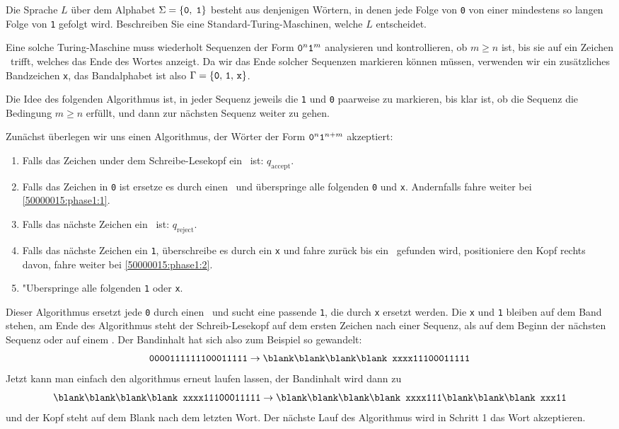 Die Sprache $L$ über dem Alphabet $\Sigma = \{{\tt 0},\;{\tt 1}\}$
besteht aus denjenigen Wörtern, in denen jede Folge von {\tt 0}
von einer mindestens so langen Folge von {\tt 1} gefolgt wird.
Beschreiben Sie eine Standard-Turing-Maschinen, welche $L$
entscheidet.


\begin{loesung}
Eine solche Turing-Maschine muss wiederholt Sequenzen der
Form ${\tt 0}^n{\tt 1}^m$ analysieren und kontrollieren, ob $m \ge n$ ist,
bis sie auf ein Zeichen \blank\ trifft, welches das Ende des
Wortes anzeigt. Da wir das Ende solcher Sequenzen markieren 
können müssen, verwenden wir ein zusätzliches Bandzeichen
{\tt x}, das Bandalphabet ist also $\Gamma
=\{{\tt 0},\,{\tt 1},\,{\tt x}\}$.

Die Idee des folgenden Algorithmus ist, in jeder Sequenz jeweils
die {\tt 1} und {\tt 0} paarweise zu markieren, bis klar ist,
ob die Sequenz die Bedingung $m\ge n$ erfüllt, und dann zur
nächsten Sequenz weiter zu gehen.

Zunächst überlegen wir uns einen Algorithmus, der Wörter der Form
${\tt 0}^n{\tt 1}^{n+m}$ akzeptiert:
\begin{enumerate}
\item Falls das Zeichen under dem Schreibe-Lesekopf ein \blank\ ist:
$q_\text{accept}$.
\item
\label{50000015:phase1:2}
Falls das Zeichen in {\tt 0} ist ersetze es durch einen \blank\ und
überspringe alle folgenden {\tt 0} und {\tt x}.
Andernfalls fahre weiter bei \ref{50000015:phase1:1}.
\item
Falls das nächste Zeichen ein \blank\ ist: $q_\text{reject}$.
\item
Falls das nächste Zeichen ein {\tt 1}, überschreibe es durch ein {\tt x}
und fahre zurück bis ein \blank\ gefunden wird, positioniere den Kopf
rechts davon, fahre weiter bei \ref{50000015:phase1:2}.
\item
\label{50000015:phase1:1}
"Uberspringe alle folgenden {\tt 1} oder {\tt x}.
\end{enumerate}
Dieser Algorithmus ersetzt jede {\tt 0} durch einen \blank\ und sucht eine
passende {\tt 1}, die durch {\tt x} ersetzt werden.
Die {\tt x} und {\tt 1} bleiben auf dem Band stehen, am Ende des Algorithmus
steht der Schreib-Lesekopf auf dem ersten Zeichen nach einer Sequenz,
als auf dem Beginn der nächsten Sequenz oder auf einem \blank.
Der Bandinhalt hat sich also zum Beispiel so gewandelt:
\[
\text {\tt 0000111111100011111}
\rightarrow
\text {\tt \blank\blank\blank\blank xxxx11100011111}
\]
Jetzt kann man einfach den algorithmus erneut laufen lassen, der Bandinhalt
wird dann zu
\[
\text {\tt \blank\blank\blank\blank xxxx11100011111}
\rightarrow
\text {\tt \blank\blank\blank\blank xxxx111\blank\blank\blank xxx11}
\]
und der Kopf steht auf dem Blank nach dem letzten Wort.
Der nächste Lauf des Algorithmus wird in Schritt 1 das Wort akzeptieren.


\end{loesung}
